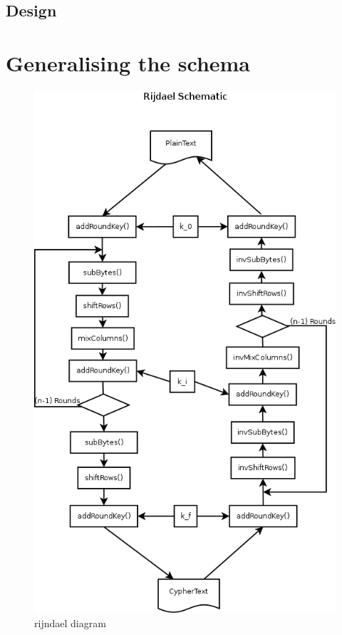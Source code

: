 \documentclass[a4paper,twoside]{llncs}
\begin{document}

\subsection{Design}

\section{Generalising the schema}

\begin{figure}[h]
 \centering
 \includegraphics[scale=0.3,keepaspectratio=true]{./images/rijndaelDiagram.png}
 \caption{rijndael diagram}
 \label{fig:RijndaelDiagram}
\end{figure}
\end{document}
